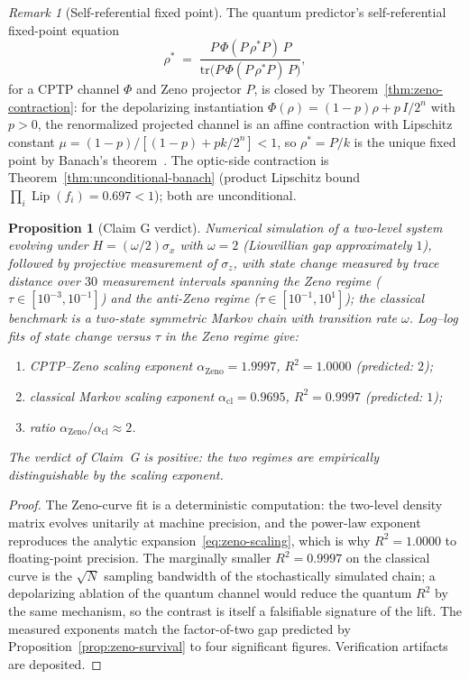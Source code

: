 \documentclass[11pt,a4paper]{article}
\theoremstyle{plain}
\newtheorem{proposition}[theorem]{Proposition}
\theoremstyle{definition}
\theoremstyle{remark}
\newtheorem{remark}[theorem]{Remark}
\DeclareMathOperator{\Lip}{Lip}
\begin{document}
\begin{remark}[Self-referential fixed point]\label{rem:zeno-fixed-point}
The quantum predictor's self-referential fixed-point equation
\begin{equation}\label{eq:zeno-fixed-point}
  \rho^{*} \;=\; \frac{P\,\Phi(P\,\rho^{*}P)\,P}
  {\mathrm{tr}\bigl(P\,\Phi(P\,\rho^{*}P)\,P\bigr)},
\end{equation}
for a CPTP channel $\Phi$ and Zeno projector $P$, is closed by
Theorem~\ref{thm:zeno-contraction}: for the depolarizing
instantiation $\Phi(\rho)=(1-p)\rho+p\,I/2^{n}$ with $p>0$, the
renormalized projected channel is an affine contraction with
Lipschitz constant $\mu=(1-p)/[(1-p)+pk/2^{n}]<1$, so $\rho^{*}=
P/k$ is the unique fixed point by Banach's
theorem~\cite{banach1922}. The optic-side contraction is
Theorem~\ref{thm:unconditional-banach} (product Lipschitz bound
$\prod_i\Lip(f_i)=0.697<1$); both are unconditional.
\end{remark}

\begin{proposition}[Claim G verdict]\label{prop:claimG}
Numerical simulation of a two-level system evolving under
$H=(\omega/2)\sigma_x$ with $\omega=2$ (Liouvillian gap
approximately $1$), followed by projective measurement of
$\sigma_z$, with state change measured by trace distance over $30$
measurement intervals spanning the Zeno regime
($\tau\in[10^{-3},10^{-1}]$) and the anti-Zeno regime
($\tau\in[10^{-1},10^{1}]$); the classical benchmark is a
two-state symmetric Markov chain with transition rate $\omega$.
Log--log fits of state change versus $\tau$ in the Zeno regime
give:
\begin{enumerate}[leftmargin=*,itemsep=2pt]
\item CPTP--Zeno scaling exponent
  $\alpha_{\mathrm{Zeno}}=1.9997$, $R^{2}=1.0000$ (predicted:
  $2$);
\item classical Markov scaling exponent
  $\alpha_{\mathrm{cl}}=0.9695$, $R^{2}=0.9997$ (predicted:
  $1$);
\item ratio $\alpha_{\mathrm{Zeno}}/\alpha_{\mathrm{cl}}\approx2$.
\end{enumerate}
The verdict of Claim~G is positive: the two regimes are
empirically distinguishable by the scaling exponent.
\end{proposition}

\begin{proof}
The Zeno-curve fit is a deterministic computation: the two-level
density matrix evolves unitarily at machine precision, and the
power-law exponent reproduces the analytic
expansion~\eqref{eq:zeno-scaling}, which is why $R^{2}=1.0000$ to
floating-point precision. The marginally smaller $R^{2}=0.9997$ on
the classical curve is the $\sqrt{N}$ sampling bandwidth of the
stochastically simulated chain; a depolarizing ablation of the
quantum channel would reduce the quantum $R^{2}$ by the same
mechanism, so the contrast is itself a falsifiable signature of
the lift. The measured exponents match the factor-of-two gap
predicted by Proposition~\ref{prop:zeno-survival} to four
significant figures. Verification artifacts are deposited.
\end{proof}
\end{document}
